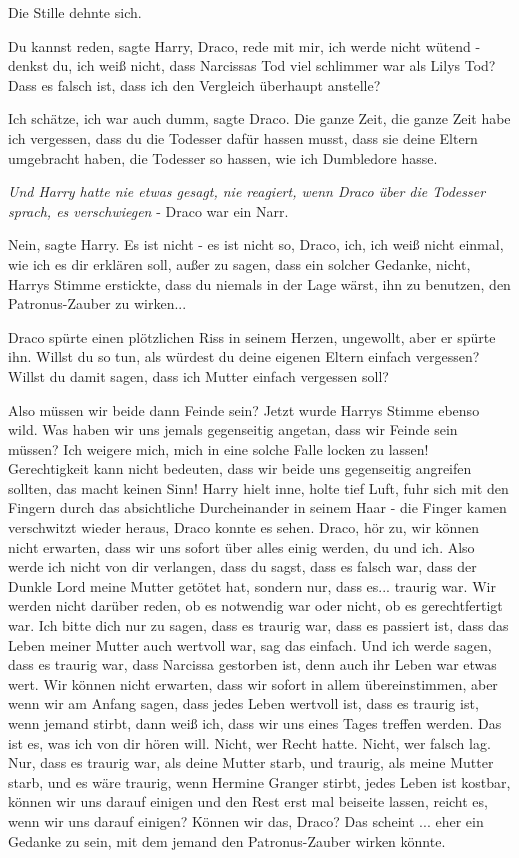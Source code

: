 Die Stille dehnte sich.

\glqq Du kannst reden\grqq{}, sagte Harry, \glqq Draco, rede mit mir, ich werde
nicht wütend - denkst du, ich weiß nicht, dass Narcissas Tod viel schlimmer war
als Lilys Tod? Dass es falsch ist, dass ich den Vergleich überhaupt
anstelle?\grqq{}

\glqq Ich schätze, ich war auch dumm\grqq{}, sagte Draco. \glqq Die ganze Zeit,
die ganze Zeit habe ich vergessen, dass du die Todesser dafür hassen musst, dass
sie deine Eltern umgebracht haben, die Todesser so hassen, wie ich Dumbledore
hasse.\grqq{}

\emph{Und Harry hatte nie etwas gesagt, nie reagiert, wenn Draco über die
Todesser sprach, es verschwiegen} - Draco war ein Narr.

\glqq Nein\grqq{}, sagte Harry. \glqq Es ist nicht - es ist nicht so, Draco,
ich, ich weiß nicht einmal, wie ich es dir erklären soll, außer zu sagen, dass
ein solcher Gedanke, nicht\grqq{}, Harrys Stimme erstickte, \glqq dass du
niemals in der Lage wärst, ihn zu benutzen, den Patronus-Zauber zu
wirken...\grqq{}

Draco spürte einen plötzlichen Riss in seinem Herzen, ungewollt, aber er spürte
ihn. \glqq Willst du so tun, als würdest du deine eigenen Eltern einfach
vergessen? Willst du damit sagen, dass ich Mutter einfach vergessen soll?\grqq{}

\glqq Also müssen wir beide dann Feinde sein?\grqq{} Jetzt wurde Harrys Stimme
ebenso wild. \glqq Was haben wir uns jemals gegenseitig angetan, dass wir Feinde
sein müssen? Ich weigere mich, mich in eine solche Falle locken zu lassen!
Gerechtigkeit kann nicht bedeuten, dass wir beide uns gegenseitig angreifen
sollten, das macht keinen Sinn!\grqq{} Harry hielt inne, holte tief Luft, fuhr
sich mit den Fingern durch das absichtliche Durcheinander in seinem Haar - die
Finger kamen verschwitzt wieder heraus, Draco konnte es sehen. \glqq Draco, hör
zu, wir können nicht erwarten, dass wir uns sofort über alles einig werden, du
und ich. Also werde ich nicht von dir verlangen, dass du sagst, dass es falsch
war, dass der Dunkle Lord meine Mutter getötet hat, sondern nur, dass es...
traurig war. Wir werden nicht darüber reden, ob es notwendig war oder nicht, ob
es gerechtfertigt war. Ich bitte dich nur zu sagen, dass es traurig war, dass es
passiert ist, dass das Leben meiner Mutter auch wertvoll war, sag das einfach.
Und ich werde sagen, dass es traurig war, dass Narcissa gestorben ist, denn auch
ihr Leben war etwas wert. Wir können nicht erwarten, dass wir sofort in allem
übereinstimmen, aber wenn wir am Anfang sagen, dass jedes Leben wertvoll ist,
dass es traurig ist, wenn jemand stirbt, dann weiß ich, dass wir uns eines Tages
treffen werden. Das ist es, was ich von dir hören will. Nicht, wer Recht hatte.
Nicht, wer falsch lag. Nur, dass es traurig war, als deine Mutter starb, und
traurig, als meine Mutter starb, und es wäre traurig, wenn Hermine Granger
stirbt, jedes Leben ist kostbar, können wir uns darauf einigen und den Rest erst
mal beiseite lassen, reicht es, wenn wir uns darauf einigen? Können wir das,
Draco? Das scheint ... eher ein Gedanke zu sein, mit dem jemand den
Patronus-Zauber wirken könnte.\grqq{}

